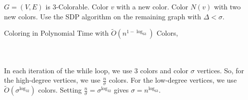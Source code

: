         \begin{algorithm}[H] 
            \begin{algorithmic}[1]
                \Require \(G=(V,E)\) is \(3\)-Colorable.
                        \State Color \(v\) with a new color. 
                        \State Color \(N(v)\) with two new colors.
                    \EndWhile
                    \State Use the SDP algorithm on the remaining graph with \(\Delta<\sigma\).
                \EndProcedure 
            \end{algorithmic}
            \caption{Coloring in Polynomial Time with \(\tilde{O}\left(n^{1-\log_63}\right)\) Colors, \cite{karger1998approximategraph}}
            \label{alg:3color-relax-sdp}
        \end{algorithm}
        \vphantom
        \\
        \\
        In each iteration of the while loop, we use \(3\) colors and color \(\sigma\) vertices. So, for the high-degree vertices, we use \(\frac{n}{\sigma}\) colors. For the low-degree vertices, we use \(\tilde{O}\left(\sigma^{\log_32}\right)\) colors. Setting \(\frac{n}{\sigma}=\sigma^{\log_32}\) gives \(\sigma=n^{\log_63}\).